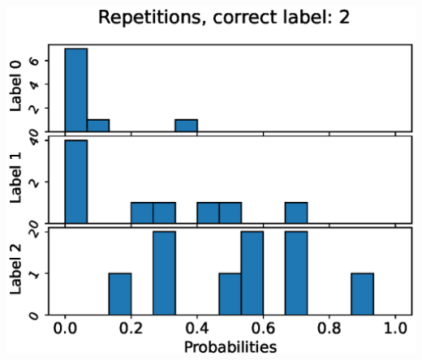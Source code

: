\begin{center}
\begin{minipage}{0.33\textwidth}
  \includegraphics[width=\textwidth]{files/figs/app/hists/kmfp/r2.eps}
\end{minipage}


\end{center}

